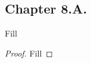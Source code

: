\subsection*{Chapter 8.A. }


\begin{exercise}{1}
  Fill
\end{exercise}
\begin{proof}
 Fill
\end{proof}